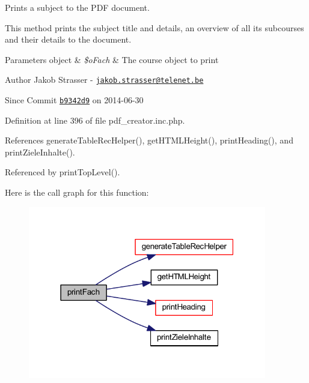 Prints a subject to the P\+D\+F document. 

This method prints the subject title and details, an overview of all its subcourses and their details to the document.


\begin{DoxyParams}[1]{Parameters}
object & {\em \$o\+Fach} & The course object to print\\
\hline
\end{DoxyParams}
\begin{DoxyAuthor}{Author}
Jakob Strasser -\/ \href{mailto:jakob.strasser@telenet.be}{\tt jakob.\+strasser@telenet.\+be} 
\end{DoxyAuthor}
\begin{DoxySince}{Since}
Commit \href{http://github.com/TheJake123/DrupalModul/commit/b9342d941b3f93e212f3f6af0823a07524dd5954}{\tt b9342d9} on 2014-\/06-\/30 
\end{DoxySince}


Definition at line 396 of file pdf\+\_\+creator.\+inc.\+php.



References generate\+Table\+Rec\+Helper(), get\+H\+T\+M\+L\+Height(), print\+Heading(), and print\+Ziele\+Inhalte().



Referenced by print\+Top\+Level().



Here is the call graph for this function\+:
\nopagebreak
\begin{figure}[H]
\begin{center}
\leavevmode
\includegraphics[width=295pt]{classoverview_p_d_f_abf0674d88080affc25c472fbd0525896_cgraph}
\end{center}
\end{figure}




